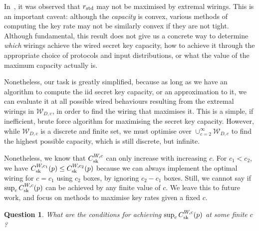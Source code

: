 \documentclass[10pt, a4paper]{article}
\numberwithin{equation}{section} %
\theoremstyle{definition}
\theoremstyle{plain}
\newtheorem{question}{Question}
\newcommand{\?}{\mathrel{?}} %
\newcommand{\sW}{\mathcal{W}}
\newcommand{\sk}{\rm sk}
\newcommand{\std}{\rm std}
\begin{document}
                  In~\cite{JanLiThesis}, it was observed that \(r_{\std}\) may not be maximised by extremal wirings. This is an important caveat: although the \emph{capacity} is convex, various methods of computing the key rate may not be similarly convex if they are not tight. Although fundamental, this result does not give us a concrete way to determine \emph{which} wirings achieve the wired secret key capacity, how to achieve it through the appropriate choice of protocols and input distributions, or what the value of the maximum capacity actually is.

                  Nonetheless, our task is greatly simplified, because as long as we have an algorithm to compute the iid secret key capacity, or an approximation to it, we can evaluate it at all possible wired behaviours resulting from the extremal wirings in \(\sW_{D,c}\), in order to find the wiring that maximises it. This is a simple, if inefficient, brute force algorithm for maximising the secret key capacity. However, while \(\sW_{D,c}\) is a discrete and finite set, we must optimise over \(\cup_{c=2}^{\infty} \sW_{D,c}\) to find the highest possible capacity, which is still discrete, but infinite.

                  Nonetheless, we know that \(C_{\sk}^{W,c}\) can only increase with increasing \(c\). For \(c_1 < c_2\), we have \(C^{W,c_1}_{\sk}(p) \leq C^{W,c_2}_{\sk}(p)\) because we can always implement the optimal wiring for \(c = c_1\) using \(c_2\) boxes, by ignoring \(c_2 - c_1\) boxes. Still, we cannot say if \(\sup_c C_{\sk}^{W,c}(p)\) can be achieved by any finite value of \(c\). We leave this to future work, and focus on methods to maximise key rates given a fixed \(c\).
                  \begin{question}
                    What are the conditions for achieving \(\sup_c C_{\sk}^{W,c}(p)\) at some finite \(c\)?
                  \end{question}
\end{document}
